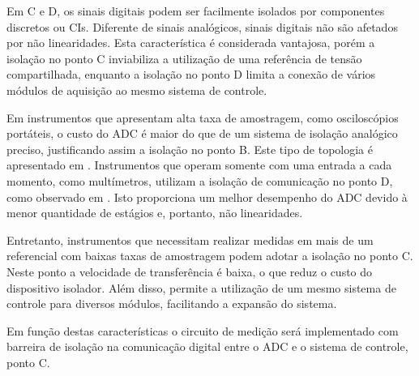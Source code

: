 			Em C e D, os sinais digitais podem ser facilmente isolados por componentes discretos ou CIs. Diferente de sinais analógicos, sinais digitais não são afetados por não linearidades. Esta característica é considerada vantajosa, porém a isolação no ponto C inviabiliza a utilização de uma referência de tensão compartilhada, enquanto a isolação no ponto D limita a conexão de vários módulos de aquisição ao mesmo sistema de controle.

			Em instrumentos que apresentam alta taxa de amostragem, como osciloscópios portáteis, o custo do ADC é maior do que de um sistema de isolação analógico preciso, justificando assim a isolação no ponto B. Este tipo de topologia é apresentado em \cite[][p.5]{agilentChooseHandheldOsc}. Instrumentos que operam somente com uma entrada a cada momento, como multímetros, utilizam a isolação de comunicação no ponto D, como observado em \cite[][p.154]{dmm34401a}. Isto proporciona um melhor desempenho do ADC devido à menor quantidade de estágios e, portanto, não linearidades.

			Entretanto, instrumentos que necessitam realizar medidas em mais de um referencial com baixas taxas de amostragem podem adotar a isolação no ponto C. Neste ponto a velocidade de transferência é baixa, o que reduz o custo do dispositivo isolador. Além disso, permite a utilização de um mesmo sistema de controle para diversos módulos, facilitando a expansão do sistema.

			Em função destas características o circuito de medição será implementado com barreira de isolação na comunicação digital entre o ADC e o sistema de controle, ponto C.

